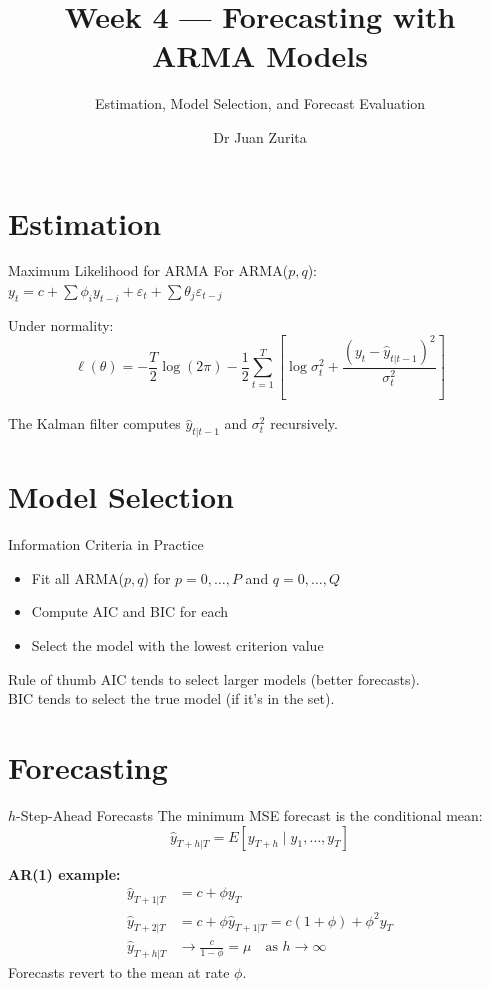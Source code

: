 \documentclass[aspectratio=169, 10pt]{beamer}
\title{Week 4 --- Forecasting with ARMA Models}
\subtitle{Estimation, Model Selection, and Forecast Evaluation}
\author{Dr Juan Zurita}
\institute{Economic \& Business Forecasting\\
The University of Edinburgh~$\cdot$~School of Economics}
\date{}
\begin{document}
\maketitle


\section{Estimation}

\begin{frame}{Maximum Likelihood for ARMA}
For ARMA($p,q$): $y_t = c + \sum \phi_i y_{t-i} + \varepsilon_t + \sum \theta_j \varepsilon_{t-j}$

\vspace{0.5em}
Under normality:
\[
\ell(\theta) = -\frac{T}{2}\log(2\pi) - \frac{1}{2}\sum_{t=1}^{T}\left[\log \sigma_t^2 + \frac{(y_t - \hat{y}_{t|t-1})^2}{\sigma_t^2}\right]
\]

The Kalman filter computes $\hat{y}_{t|t-1}$ and $\sigma_t^2$ recursively.
\end{frame}

\section{Model Selection}

\begin{frame}{Information Criteria in Practice}
\begin{itemize}
    \item Fit all ARMA($p,q$) for $p = 0,\ldots,P$ and $q = 0,\ldots,Q$
    \item Compute AIC and BIC for each
    \item Select the model with the \alert{lowest} criterion value
\end{itemize}

\vspace{0.5em}
\begin{block}{Rule of thumb}
AIC tends to select larger models (better forecasts). \\
BIC tends to select the true model (if it's in the set).
\end{block}
\end{frame}

\section{Forecasting}

\begin{frame}{$h$-Step-Ahead Forecasts}
The \alert{minimum MSE} forecast is the conditional mean:
\[
\hat{y}_{T+h|T} = E[y_{T+h} \mid y_1, \ldots, y_T]
\]

\textbf{AR(1) example:}
\begin{align}
\hat{y}_{T+1|T} &= c + \phi y_T \\
\hat{y}_{T+2|T} &= c + \phi \hat{y}_{T+1|T} = c(1+\phi) + \phi^2 y_T \\
\hat{y}_{T+h|T} &\to \frac{c}{1-\phi} = \mu \quad \text{as } h \to \infty
\end{align}
Forecasts \alert{revert to the mean} at rate $\phi$.
\end{frame}
\end{document}
